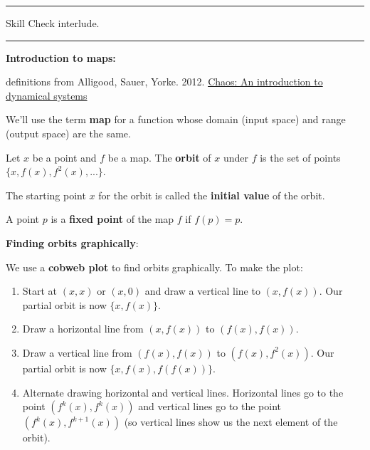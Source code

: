\documentclass[12pt,letterpaper,noanswers]{exam}
\begin{document}
\vspace{0.2cm}
\hrule
\vspace{0.2cm}

\noindent Skill Check interlude.

\vspace{0.2cm}
\hrule
\vspace{0.2cm}

\noindent \textbf{Introduction to maps:}

definitions from Alligood, Sauer, Yorke. 2012. \underline{Chaos: An introduction to dynamical systems}
\begin{tcolorbox}

We'll use the term \textbf{map} for a function whose domain (input space) and range (output space) are the same. 

Let $x$ be a point and $f$ be a map.  The \textbf{orbit} of $x$ under $f$ is the set of points $\{x, f(x), f^2(x),...\}$.  

The starting point $x$ for the orbit is called the \textbf{initial value} of the orbit.  

A point $p$ is a \textbf{fixed point} of the map $f$ if $f(p) = p$.
\end{tcolorbox}
\vfill


\eject
\noindent\textbf{Finding orbits graphically}:

\begin{tcolorbox}
We use a \textbf{cobweb plot} to find orbits graphically.  To make the plot: \begin{enumerate}
\itemsep0em
    \item Start at $(x,x)$ or $(x,0)$ and draw a vertical line to $(x,f(x))$.  Our partial orbit is now $\{x, f(x)\}$.
    \item Draw a horizontal line from $(x,f(x))$ to $(f(x),f(x))$.
    \item Draw a vertical line from $(f(x),f(x))$ to $(f(x), f^2(x))$.  Our partial orbit is now $\{x, f(x), f(f(x))\}$.
    \item Alternate drawing horizontal and vertical lines.  Horizontal lines go to the point $(f^k(x),f^k(x))$ and vertical lines go to the point $(f^k(x), f^{k+1}(x))$ (so vertical lines show us the next element of the orbit).
\end{enumerate} 
\end{tcolorbox}
\end{document}
